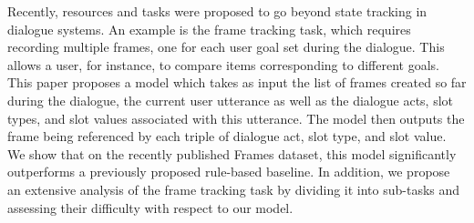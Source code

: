 Recently, resources and tasks were proposed to go beyond state tracking in dialogue systems. An example is the frame tracking task, which requires recording multiple frames, one for each user goal set during the dialogue. This allows a user, for instance, to compare items corresponding to different goals. This paper proposes a model which takes as input the list of frames created so far during the dialogue, the current user utterance as well as the dialogue acts, slot types, and slot values associated with this utterance. The model then outputs the frame being referenced by each  triple of dialogue act, slot type, and slot value. We show that on the recently published Frames dataset, this model significantly outperforms a previously proposed rule-based baseline. In addition, we propose an extensive analysis of the frame tracking task by dividing it into sub-tasks and assessing their difficulty with respect to our model.

